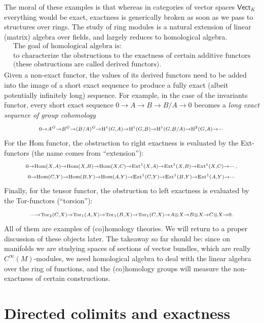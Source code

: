 The moral of these examples is that whereas in categories of vector spaces $\mathsf{Vect}_K$ everything would be exact, exactness is generically broken as soon as we pass to structures over rings. The study of ring modules is a natural extension of linear (matrix) algebra over fields, and largely reduces to homological algebra.
\[
    \boxed{\begin{array}{c}
    \text{The goal of homological algebra is:}\\
    \text{to characterize the obstructions to the exactness of certain additive functors}\\ \text{(these obstructions are called derived functors).}
    \end{array}}
\]
Given a non-exact functor, the values of its derived functors need to be added into the image of a short exact sequence to produce a fully exact (albeit potentially infinitely long) sequence. For example, in the case of the invariants functor, every short exact sequence $0\to A\to B\to B/A\to 0$ becomes a \emph{long exact sequence of group cohomology} 
\[
    \scriptstyle
    0\to A^G\to B^G\to (B/A)^G\to \mathrm{H}^1(G,A)\to \mathrm{H}^1(G,B)\to \mathrm{H}^1(G,B/A)\to \mathrm{H}^2(G,A)\to\cdots
\]
For the Hom functor, the obstruction to right exactness is evaluated by the Ext-functors (the name comes from ``extension''):
\begin{gather}
    \scriptstyle
    0\to \operatorname{Hom}(X,A)\to \operatorname{Hom}(X,B)\to\operatorname{Hom}(X,C)\to \operatorname{Ext}^1(X,A)\to \operatorname{Ext}^1(X,B)\to\operatorname{Ext}^1(X,C)\to\cdots,\\
    \scriptstyle
    0\to \operatorname{Hom}(C,Y)\to \operatorname{Hom}(B,Y)\to\operatorname{Hom}(A,Y)\to \operatorname{Ext}^1(C,Y)\to \operatorname{Ext}^1(B,Y)\to\operatorname{Ext}^1(A,Y)\to\cdots
\end{gather}
Finally, for the tensor functor, the obstruction to left exactness is evaluated by the Tor-functors (``torsion''):
\[
    \scriptstyle
    \cdots\to \operatorname{Tor}_2(C,X)\to \operatorname{Tor}_1(A,X)\to \operatorname{Tor}_1(B,X)\to\operatorname{Tor}_1(C,X)\to A\otimes X\to B\otimes X\to C\otimes X\to 0.
\]
All of them are examples of (co)homology theories. We will return to a proper discussion of these objects later. The takeaway so far should be: since on manifolds we are studying spaces of sections of vector bundles, which are really $C^\infty(M)$-modules, we need homological algebra to deal with the linear algebra over the ring of functions, and the (co)homology groups will measure the non-exactness of certain constructions.






\section{Directed colimits and exactness}

